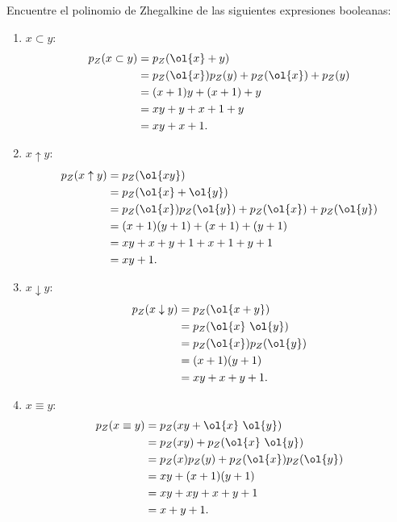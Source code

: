 \begin{ejercicio}
    Encuentre el polinomio de Zhegalkine de las siguientes expresiones booleanas:
    \begin{enumerate}
        \item $x\subset y$:
        \begin{align*}
            p_Z(x\subset y) &= p_Z(\ol{x} + y)\\
            &= p_Z(\ol{x})p_Z(y) + p_Z(\ol{x}) + p_Z(y)\\
            &= (x+1)y + (x+1) + y\\
            &= xy + y + x + 1 + y\\
            &= xy + x + 1.
        \end{align*}

        \item $x\uparrow y$:
        \begin{align*}
            p_Z(x\uparrow y) &= p_Z(\ol{xy})\\
            &= p_Z(\ol{x} + \ol{y})\\
            &= p_Z(\ol{x})p_Z(\ol{y}) + p_Z(\ol{x}) + p_Z(\ol{y})\\
            &= (x+1)(y+1) + (x+1) + (y+1)\\
            &= xy + x + y + 1 + x + 1 + y + 1\\
            &= xy + 1.
        \end{align*}

        \item $x\downarrow y$:
        \begin{align*}
            p_Z(x\downarrow y) &= p_Z(\ol{x+y})\\
            &= p_Z(\ol{x}~\ol{y})\\
            &= p_Z(\ol{x})p_Z(\ol{y})\\
            &= (x+1)(y+1)\\
            &= xy + x + y + 1.
        \end{align*}

        \item $x\equiv y$:
        \begin{align*}
            p_Z(x\equiv y) &= p_Z(xy + \ol{x}~\ol{y})\\
            &= p_Z(xy) + p_Z(\ol{x}~\ol{y})\\
            &= p_Z(x)p_Z(y) + p_Z(\ol{x})p_Z(\ol{y})\\
            &= xy + (x+1)(y+1)\\
            &= xy + xy + x + y + 1\\
            &= x + y + 1.
        \end{align*}


\end{enumerate}
\end{ejercicio}
